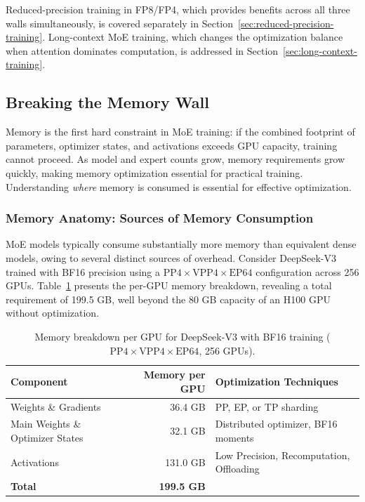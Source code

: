 Reduced-precision training in FP8/FP4, which provides benefits across all three walls simultaneously, is covered separately in Section~\ref{sec:reduced-precision-training}. Long-context MoE training, which changes the optimization balance when attention dominates computation, is addressed in Section~\ref{sec:long-context-training}.

\subsection{Breaking the Memory Wall}\label{sec:memory-wall}

Memory is the first hard constraint in MoE training: if the combined footprint of parameters, optimizer states, and activations exceeds GPU capacity, training cannot proceed. As model and expert counts grow, memory requirements grow quickly, making memory optimization essential for practical training. Understanding \emph{where} memory is consumed is essential for effective optimization.

\subsubsection{Memory Anatomy: Sources of Memory Consumption}

MoE models typically consume substantially more memory than equivalent dense models, owing to several distinct sources of overhead. Consider DeepSeek-V3 trained with BF16 precision using a $\text{PP}4 \times \text{VPP}4 \times \text{EP}64$ configuration across 256 GPUs. Table~\ref{tab:memory-breakdown} presents the per-GPU memory breakdown, revealing a total requirement of 199.5 GB, well beyond the 80 GB capacity of an H100 GPU without optimization.

\begin{table}[ht]
\centering
\caption{Memory breakdown per GPU for DeepSeek-V3 with BF16 training ($\text{PP}4 \times \text{VPP}4 \times \text{EP}64$, 256 GPUs).}
\label{tab:memory-breakdown}
\begin{tabular}{lrl}
\toprule
\textbf{Component} & \textbf{Memory per GPU} & \textbf{Optimization Techniques} \\
\midrule
Weights \& Gradients & 36.4 GB & PP, EP, or TP sharding \\
Main Weights \& Optimizer States & 32.1 GB & Distributed optimizer, BF16 moments \\
Activations & 131.0 GB & Low Precision, Recomputation, Offloading \\
\midrule
\textbf{Total} & \textbf{199.5 GB} & \\
\bottomrule
\end{tabular}
\end{table}


